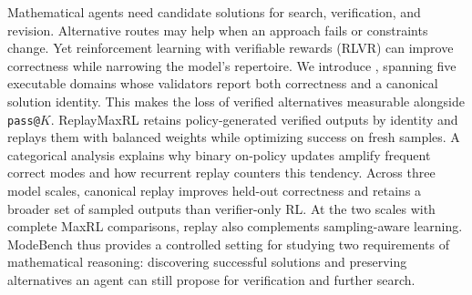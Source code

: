 
Mathematical agents need candidate solutions for search, verification, and
revision. Alternative routes may help when an approach fails or constraints
change. Yet reinforcement learning with verifiable rewards (RLVR) can improve
correctness while narrowing the model's repertoire. We introduce \mb{},
spanning five executable domains whose validators report both correctness and
a canonical solution identity. This makes the loss of verified alternatives
measurable alongside \texttt{pass@}$K$. ReplayMaxRL retains policy-generated
verified outputs by identity and replays them with balanced weights while
optimizing success on fresh samples. A categorical analysis explains why binary
on-policy updates amplify frequent correct modes and how recurrent replay
counters this tendency. Across three model scales, canonical replay improves
held-out correctness and retains a broader set of sampled outputs than
verifier-only RL. At the two scales with complete MaxRL comparisons, replay
also complements sampling-aware learning. ModeBench thus provides a controlled
setting for studying two requirements of mathematical reasoning: discovering
successful solutions and preserving alternatives an agent can still propose
for verification and further search.
